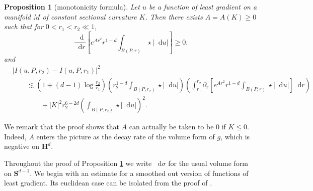 \documentclass[reqno,11pt]{amsart}
\newcommand{\Hyp}{\mathbf H}
\newcommand{\Sph}{\mathbf S}
\newcommand*\dif{\mathop{}\!\mathrm{d}}
\newtheorem{proposition}[theorem]{Proposition}
\theoremstyle{definition}
\numberwithin{equation}{section}
\begin{document}
\begin{proposition}[monotonicity formula]\label{Monotone}
Let $u$ be a function of least gradient on a manifold $M$ of constant sectional curvature $K$.
Then there exists $A = A(K) \geq 0$ such that for $0 < r_1 < r_2 \ll 1$,
\begin{equation}\label{weak monotonicity}
\frac{\dif}{\dif r}\left[e^{Ar^2}r^{1 - d} \int_{B(P, r)} \star |\dif u|\right] \geq 0.
\end{equation}
and
\begin{align*}
&|I(u, P, r_2) - I(u, P, r_1)|^2 \\
&\qquad \lesssim \left(1 + (d - 1) \log \frac{r_2}{r_1}\right) \left(r_2^{1 - d}\int_{B(P, r_2)} \star |\dif u| \right)
\left(\int_{r_1}^{r_2} \partial_r \left[e^{Ar^2} r^{1 - d} \int_{B(P, r)} \star |\dif u|\right] \dif r\right)\\
&\qquad \qquad + |K|^2 r_2^{6-2d} \left(\int_{B(P, r_2)} \star |\dif u|\right)^2.
\end{align*}
\end{proposition}

We remark that the proof shows that $A$ can actually be taken to be $0$ if $K \leq 0$.
Indeed, $A$ enters the picture as the decay rate of the volume form of $g$, which is negative on $\Hyp^d$.

Throughout the proof of Proposition \ref{Monotone} we write $\dif \sigma$ for the usual volume form on $\Sph^{d - 1}$.
We begin with an estimate for a smoothed out version of functions of least gradient.
Its euclidean case can be isolated from the proof of \cite[Lemma 5.8]{Giusti77}.
\end{document}
